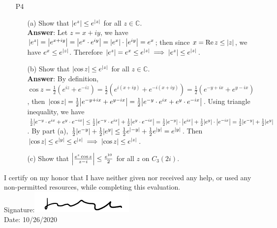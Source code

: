 \documentclass{article}
\begin{document}
\newpage
\begin{itemize}
    \item [P4]
          \begin{itemize}
              \item [(a)] Show that $\abs{e^z}\leq e^{\abs{z}}$ for all $z\in\mathbb{C}$.\\
              \textbf{Answer}: Let $z=x+iy$, we have $\abs{e^z}=\abs{e^{x+iy}}=\abs{e^x\cdot e^{iy}}=\abs{e^x}\cdot\abs{e^{iy}}=e^x$; then since $x=\Re z\leq\abs{z}$, we have $e^x\leq e^{\abs{z}}$. Therefore $\abs{e^z}=e^x\leq e^{\abs{z}}\implies\abs{e^z}\leq e^{\abs{z}}$.
              \item [(b)] Show that $\abs{\cos z}\leq e^{\abs{z}}$ for all $z\in\mathbb{C}$.\\
              \textbf{Answer}: By definition, $\cos z=\frac{1}{2}(e^{iz}+e^{-iz})=\frac{1}{2}(e^{i(x+iy)}+e^{-i(x+iy)})=\frac{1}{2}(e^{-y+ix}+e^{y-ix})$, then $\abs{\cos z}=\frac{1}{2}\abs{e^{-y+ix}+e^{y-ix}}=\frac{1}{2}\abs{e^{-y}\cdot e^{ix}+e^{y}\cdot e^{-ix}}$. Using triangle inequality, we have $\frac{1}{2}\abs{e^{-y}\cdot e^{ix}+e^{y}\cdot e^{-ix}}\leq\frac{1}{2}\abs{e^{-y}\cdot e^{ix}}+\frac{1}{2}\abs{e^{y}\cdot e^{-ix}}=\frac{1}{2}\abs{e^{-y}}\cdot\abs{e^{ix}}+\frac{1}{2}\abs{e^{y}}\cdot\abs{e^{-ix}}=\frac{1}{2}\abs{e^{-y}}+\frac{1}{2}\abs{e^{y}}$. By part (a), $\frac{1}{2}\abs{e^{-y}}+\frac{1}{2}\abs{e^{y}}\leq\frac{1}{2}e^{\abs{-y}}+\frac{1}{2}e^{\abs{y}}=e^{\abs{y}}$. Then $\abs{\cos z}\leq e^{\abs{y}}\leq e^{\abs{z}}\implies\abs{\cos z}\leq e^{\abs{z}}$.
              \item [(c)] Show that $\abs{\frac{e^z\cos z}{z-i}}\leq\frac{e^{10}}{2}$ for all $z$ on $C_3(2i)$.
          \end{itemize}
\end{itemize}

\newpage
I certify on my honor that I have neither given nor received any help, or used any non-permitted resources, while completing this evaluation.\\
Signature:\includegraphics[width=2in]{signature.png}\\
Date: 10/26/2020
\end{document}
